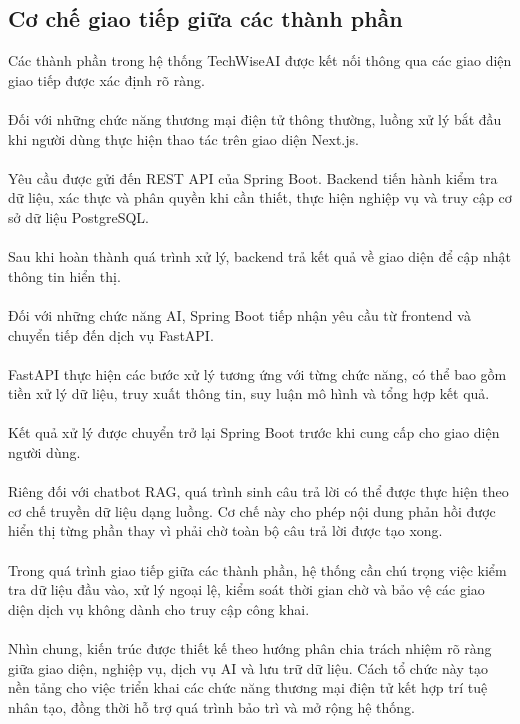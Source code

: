 \documentclass{report}
\begin{document}
\subsection{Cơ chế giao tiếp giữa các thành phần}
Các thành phần trong hệ thống
TechWiseAI được kết nối thông
qua các giao diện giao tiếp
được xác định rõ ràng.\\\\
Đối với những chức năng thương
mại điện tử thông thường, luồng
xử lý bắt đầu khi người dùng
thực hiện thao tác trên giao
diện Next.js.\\\\
Yêu cầu được gửi đến REST API
của Spring Boot. Backend tiến
hành kiểm tra dữ liệu, xác
thực và phân quyền khi cần
thiết, thực hiện nghiệp vụ
và truy cập cơ sở dữ liệu
PostgreSQL.\\\\
Sau khi hoàn thành quá trình
xử lý, backend trả kết quả
về giao diện để cập nhật
thông tin hiển thị.\\\\
Đối với những chức năng AI,
Spring Boot tiếp nhận yêu
cầu từ frontend và chuyển
tiếp đến dịch vụ FastAPI.\\\\
FastAPI thực hiện các bước
xử lý tương ứng với từng
chức năng, có thể bao gồm
tiền xử lý dữ liệu, truy
xuất thông tin, suy luận
mô hình và tổng hợp kết quả.\\\\
Kết quả xử lý được chuyển
trở lại Spring Boot trước
khi cung cấp cho giao diện
người dùng.\\\\
Riêng đối với chatbot RAG,
quá trình sinh câu trả lời
có thể được thực hiện theo
cơ chế truyền dữ liệu dạng
luồng. Cơ chế này cho phép
nội dung phản hồi được hiển
thị từng phần thay vì phải
chờ toàn bộ câu trả lời
được tạo xong.\\\\
Trong quá trình giao tiếp
giữa các thành phần, hệ
thống cần chú trọng việc
kiểm tra dữ liệu đầu vào,
xử lý ngoại lệ, kiểm soát
thời gian chờ và bảo vệ
các giao diện dịch vụ
không dành cho truy cập
công khai.\\\\
Nhìn chung, kiến trúc được
thiết kế theo hướng phân
chia trách nhiệm rõ ràng
giữa giao diện, nghiệp vụ,
dịch vụ AI và lưu trữ dữ
liệu. Cách tổ chức này tạo
nền tảng cho việc triển
khai các chức năng thương
mại điện tử kết hợp trí
tuệ nhân tạo, đồng thời
hỗ trợ quá trình bảo trì
và mở rộng hệ thống.
\end{document}
